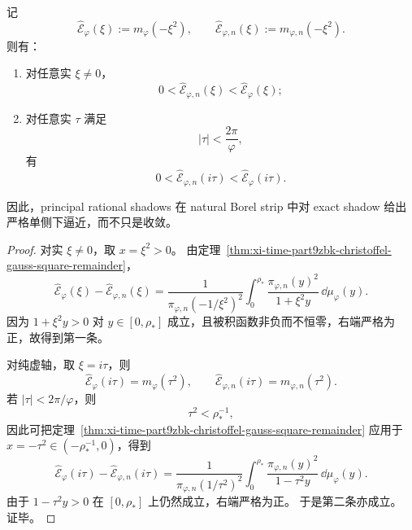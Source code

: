 \begin{corollary}\label{cor:xi-time-part9zbk-presingular-one-sided-approximation}
记
\[
\widehat{\mathcal E}_\varphi(\xi):=m_\varphi(-\xi^2),
\qquad
\widehat{\mathcal E}_{\varphi,n}(\xi):=m_{\varphi,n}(-\xi^2).
\]
则有：
\begin{enumerate}
  \item 对任意实 \(\xi\neq 0\)，
  \[
  0<\widehat{\mathcal E}_{\varphi,n}(\xi)<\widehat{\mathcal E}_\varphi(\xi);
  \]
  \item 对任意实 \(\tau\) 满足
  \[
  |\tau|<\frac{2\pi}{\varphi},
  \]
  有
  \[
  0<\widehat{\mathcal E}_{\varphi,n}(i\tau)<\widehat{\mathcal E}_\varphi(i\tau).
  \]
\end{enumerate}
因此，principal rational shadows 在 natural Borel strip 中对 exact shadow 给出严格单侧下逼近，而不只是收敛。
\end{corollary}
\begin{proof}
对实 \(\xi\neq 0\)，取 \(x=\xi^2>0\)。
由定理~\ref{thm:xi-time-part9zbk-christoffel-gauss-square-remainder}，
\[
\widehat{\mathcal E}_\varphi(\xi)-\widehat{\mathcal E}_{\varphi,n}(\xi)
=
\frac{1}{\pi_{\varphi,n}(-1/\xi^2)^2}
\int_0^{\rho_\ast}
\frac{\pi_{\varphi,n}(y)^2}{1+\xi^2 y}\,\dd\mu_\varphi(y).
\]
因为 \(1+\xi^2y>0\) 对 \(y\in[0,\rho_\ast]\) 成立，且被积函数非负而不恒零，右端严格为正，故得到第一条。

对纯虚轴，取 \(\xi=i\tau\)，则
\[
\widehat{\mathcal E}_\varphi(i\tau)=m_\varphi(\tau^2),
\qquad
\widehat{\mathcal E}_{\varphi,n}(i\tau)=m_{\varphi,n}(\tau^2).
\]
若 \(|\tau|<2\pi/\varphi\)，则
\[
\tau^2<\rho_\ast^{-1},
\]
因此可把定理~\ref{thm:xi-time-part9zbk-christoffel-gauss-square-remainder} 应用于 \(x=-\tau^2\in(-\rho_\ast^{-1},0)\)，得到
\[
\widehat{\mathcal E}_\varphi(i\tau)-\widehat{\mathcal E}_{\varphi,n}(i\tau)
=
\frac{1}{\pi_{\varphi,n}(1/\tau^2)^2}
\int_0^{\rho_\ast}
\frac{\pi_{\varphi,n}(y)^2}{1-\tau^2 y}\,\dd\mu_\varphi(y).
\]
由于 \(1-\tau^2 y>0\) 在 \([0,\rho_\ast]\) 上仍然成立，右端严格为正。
于是第二条亦成立。
证毕。
\end{proof}

